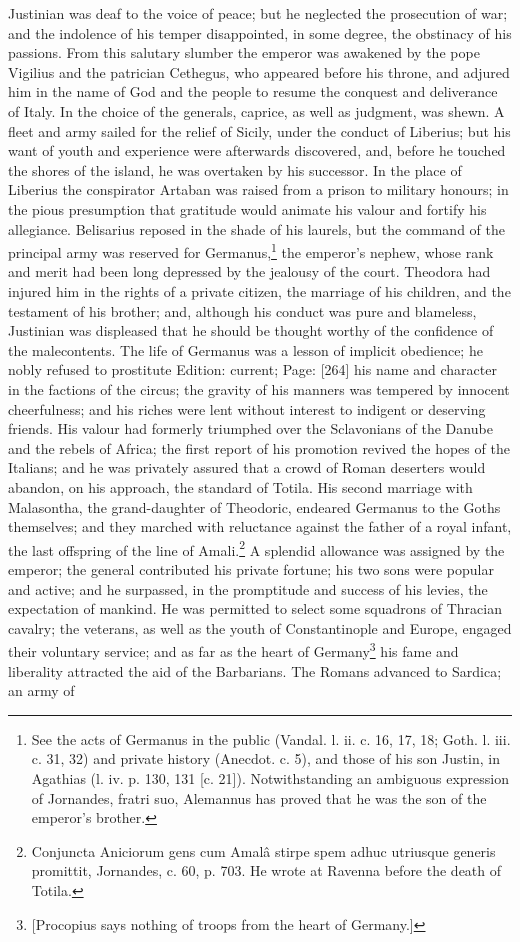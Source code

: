 Justinian was deaf to the voice of peace; but he neglected the prosecution of war; and the indolence of his temper disappointed, in some degree, the obstinacy of his passions. From this salutary slumber the emperor was awakened by the pope Vigilius and the patrician Cethegus, who appeared before his throne, and adjured him in the name of God and the people to resume the conquest and deliverance of Italy. In the choice of the generals, caprice, as well as judgment, was shewn. A fleet and army sailed for the relief of Sicily, under the conduct of Liberius; but his want of youth and experience were afterwards discovered, and, before he touched the shores of the island, he was overtaken by his successor. In the place of Liberius the conspirator Artaban was raised from a prison to military honours; in the pious presumption that gratitude would animate his valour and fortify his allegiance. Belisarius reposed in the shade of his laurels, but the command of the principal army was reserved for Germanus,\footnote{See the acts of Germanus in the public (Vandal. l. ii. c. 16, 17, 18; Goth. l. iii. c. 31, 32) and private history (Anecdot. c. 5), and those of his son Justin, in Agathias (l. iv. p. 130, 131 [c. 21]). Notwithstanding an ambiguous expression of Jornandes, fratri suo, Alemannus has proved that he was the son of the emperor\texthebrew{}’s brother.} the emperor\texthebrew{}’s nephew, whose rank and merit had been long depressed by the jealousy of the court. Theodora had injured him in the rights of a private citizen, the marriage of his children, and the testament of his brother; and, although his conduct was pure and blameless, Justinian was displeased that he should be thought worthy of the confidence of the malecontents. The life of Germanus was a lesson of implicit obedience; he nobly refused to prostitute Edition: current; Page: [264] his name and character in the factions of the circus; the gravity of his manners was tempered by innocent cheerfulness; and his riches were lent without interest to indigent or deserving friends. His valour had formerly triumphed over the Sclavonians of the Danube and the rebels of Africa; the first report of his promotion revived the hopes of the Italians; and he was privately assured that a crowd of Roman deserters would abandon, on his approach, the standard of Totila. His second marriage with Malasontha, the grand-daughter of Theodoric, endeared Germanus to the Goths themselves; and they marched with reluctance against the father of a royal infant, the last offspring of the line of Amali.\footnote{Conjuncta Aniciorum gens cum Amalâ stirpe spem adhuc utriusque generis promittit, Jornandes, c. 60, p. 703. He wrote at Ravenna before the death of Totila.} A splendid allowance was assigned by the emperor; the general contributed his private fortune; his two sons were popular and active; and he surpassed, in the promptitude and success of his levies, the expectation of mankind. He was permitted to select some squadrons of Thracian cavalry; the veterans, as well as the youth of Constantinople and Europe, engaged their voluntary service; and as far as the heart of Germany\footnote{[Procopius says nothing of troops from the heart of Germany.]} his fame and liberality attracted the aid of the Barbarians. The Romans advanced to Sardica; an army of 